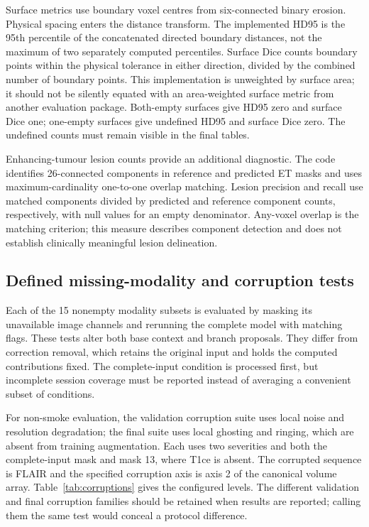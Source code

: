 \documentclass[conference]{IEEEtran}
\begin{document}
Surface metrics use boundary voxel centres from six-connected binary erosion. Physical spacing enters the distance transform. The implemented HD95 is the 95th percentile of the concatenated directed boundary distances, not the maximum of two separately computed percentiles. Surface Dice counts boundary points within the physical tolerance in either direction, divided by the combined number of boundary points. This implementation is unweighted by surface area; it should not be silently equated with an area-weighted surface metric from another evaluation package. Both-empty surfaces give HD95 zero and surface Dice one; one-empty surfaces give undefined HD95 and surface Dice zero. The undefined counts must remain visible in the final tables.

Enhancing-tumour lesion counts provide an additional diagnostic. The code identifies 26-connected components in reference and predicted ET masks and uses maximum-cardinality one-to-one overlap matching. Lesion precision and recall use matched components divided by predicted and reference component counts, respectively, with null values for an empty denominator. Any-voxel overlap is the matching criterion; this measure describes component detection and does not establish clinically meaningful lesion delineation.

\subsection{Defined missing-modality and corruption tests}
Each of the 15 nonempty modality subsets is evaluated by masking its unavailable image channels and rerunning the complete model with matching flags. These tests alter both base context and branch proposals. They differ from correction removal, which retains the original input and holds the computed contributions fixed. The complete-input condition is processed first, but incomplete session coverage must be reported instead of averaging a convenient subset of conditions.

For non-smoke evaluation, the validation corruption suite uses local noise and resolution degradation; the final suite uses local ghosting and ringing, which are absent from training augmentation. Each uses two severities and both the complete-input mask and mask 13, where T1ce is absent. The corrupted sequence is FLAIR and the specified corruption axis is axis 2 of the canonical volume array. Table~\ref{tab:corruptions} gives the configured levels. The different validation and final corruption families should be retained when results are reported; calling them the same test would conceal a protocol difference.
\end{document}
